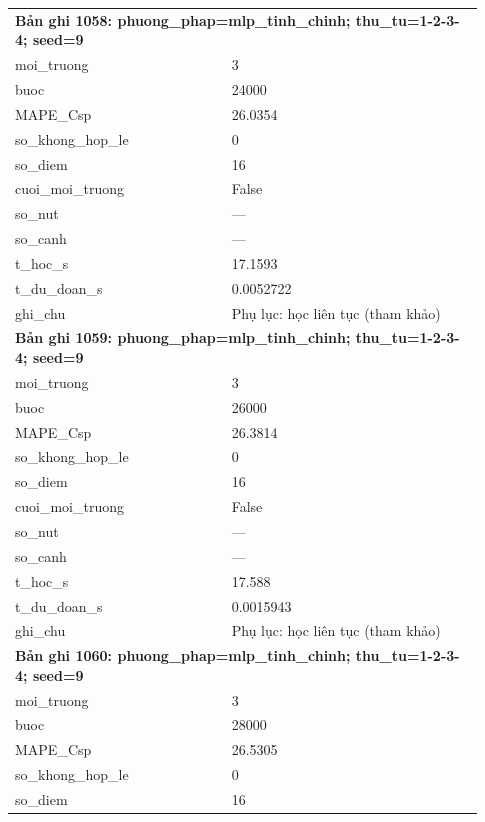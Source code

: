 \begin{longtable}{p{0.43\linewidth}p{0.50\linewidth}}
\midrule
\multicolumn{2}{p{0.95\linewidth}}{\textbf{Bản ghi 1058: phuong\_phap=mlp\_tinh\_chinh; thu\_tu=1-2-3-4; seed=9}} \\
moi\_\allowbreak truong & 3 \\
buoc & 24000 \\
MAPE\_\allowbreak Csp & 26.0354 \\
so\_\allowbreak khong\_\allowbreak hop\_\allowbreak le & 0 \\
so\_\allowbreak diem & 16 \\
cuoi\_\allowbreak moi\_\allowbreak truong & False \\
so\_\allowbreak nut & — \\
so\_\allowbreak canh & — \\
t\_\allowbreak hoc\_\allowbreak s & 17.1593 \\
t\_\allowbreak du\_\allowbreak doan\_\allowbreak s & 0.0052722 \\
ghi\_\allowbreak chu & Phụ lục: học liên tục (tham khảo) \\
\midrule
\multicolumn{2}{p{0.95\linewidth}}{\textbf{Bản ghi 1059: phuong\_phap=mlp\_tinh\_chinh; thu\_tu=1-2-3-4; seed=9}} \\
moi\_\allowbreak truong & 3 \\
buoc & 26000 \\
MAPE\_\allowbreak Csp & 26.3814 \\
so\_\allowbreak khong\_\allowbreak hop\_\allowbreak le & 0 \\
so\_\allowbreak diem & 16 \\
cuoi\_\allowbreak moi\_\allowbreak truong & False \\
so\_\allowbreak nut & — \\
so\_\allowbreak canh & — \\
t\_\allowbreak hoc\_\allowbreak s & 17.588 \\
t\_\allowbreak du\_\allowbreak doan\_\allowbreak s & 0.0015943 \\
ghi\_\allowbreak chu & Phụ lục: học liên tục (tham khảo) \\
\midrule
\multicolumn{2}{p{0.95\linewidth}}{\textbf{Bản ghi 1060: phuong\_phap=mlp\_tinh\_chinh; thu\_tu=1-2-3-4; seed=9}} \\
moi\_\allowbreak truong & 3 \\
buoc & 28000 \\
MAPE\_\allowbreak Csp & 26.5305 \\
so\_\allowbreak khong\_\allowbreak hop\_\allowbreak le & 0 \\
so\_\allowbreak diem & 16 \\

\end{longtable}
